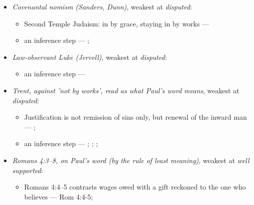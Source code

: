 \documentclass[11pt]{article}
\begin{document}
\begin{itemize}
\begin{itemize}
\item πίστις Χριστοῦ is Christ's faithfulness, the means of God's deliverance (encoded as a denial, so it ranks disputed) --- \cite{campbell-deliverance-god-2009}; \cite[ad loc. Gal 2:16]{martyn-galatians-1997}; \cite{hays-faith-jesus-christ-2002}
\item δικαιοσύνη θεοῦ names God's deliverance in Christ, not a status faith obtains --- \cite{campbell-deliverance-god-2009}; \cite{martyn-galatians-1997}; Rom 3:21-26
\end{itemize}
\item \emph{Covenantal nomism (Sanders, Dunn)}, weakest at \emph{disputed}:
\begin{itemize}
\item Second Temple Judaism: in by grace, staying in by works --- \cite{sanders-paul-palestinian-judaism-1977}
\item an inference step --- \cite{dunn-new-perspective-2005}; \cite{wright-what-paul-said-1997}
\end{itemize}
\item \emph{Law-observant Luke (Jervell)}, weakest at \emph{disputed}:
\begin{itemize}
\item an inference step --- \cite{jervell-luke-people-god-1972}
\end{itemize}
\item \emph{Trent, against 'not by works', read as what Paul's word means}, weakest at \emph{disputed}:
\begin{itemize}
\item Justification is not remission of sins only, but renewal of the inward man --- \cite[Trent, Session VI (1547), Decree on Justification, ch. 7]{tanner-decrees-1990}; \cite[Trent, Session VI (1547), canon 11]{tanner-decrees-1990}
\item an inference step --- \cite[Trent, Session VI (1547), Decree on Justification, ch. 8]{tanner-decrees-1990}; \cite[Trent, Session VI (1547), Decree on Justification, ch. 7]{tanner-decrees-1990}; \cite[On the Spirit and the Letter, ch. 45 (26.45)]{npnf1-05-1887}; \cite{mcgrath-iustitia-dei-2005}
\end{itemize}
\item \emph{Romans 4:3–8, on Paul's word (by the rule of least meaning)}, weakest at \emph{well supported}:
\begin{itemize}
\item Romans 4:4–5 contrasts wages owed with a gift reckoned to the one who believes --- Rom 4:4-5; \cite[III.xi.18]{calvin-institutes-1960}

\end{itemize}
\end{itemize}
\end{document}
